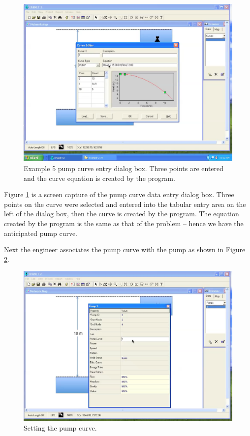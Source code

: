 \begin{figure}[htbp] %
   \centering
   \includegraphics[width=5in]{pump-curve.pdf} 
   \caption{Example 5 pump curve entry dialog box.  Three points are entered and the curve equation is created by the program.}
   \label{fig:pump-curve.pdf}
\end{figure}
Figure \ref{fig:pump-curve.pdf} is a screen capture of the pump curve data entry dialog box.   Three points on the curve were selected and entered into the tabular entry area on the left of the dialog box, then the curve is created by the program.  The equation created by the program is the same as that of the problem -- hence we have the anticipated pump curve.
\newpage

Next the engineer associates the pump curve with the pump as shown in Figure \ref{fig:set-curve}.
\begin{figure}[htbp] %
   \centering
   \includegraphics[width=5in]{set-curve.pdf} 
   \caption{Setting the pump curve.}
   \label{fig:set-curve}
\end{figure}


